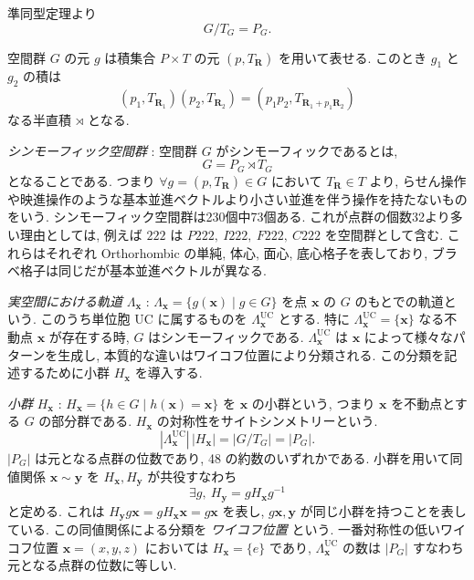 \documentclass[12pt]{article}
\newcommand{\vect}[1]{\boldsymbol{#1}}
\begin{document}
準同型定理より
\begin{equation}
 G / T_G = P_G.
\end{equation}

空間群 $G$ の元 $g$ は積集合 $P \times T$ の元 $(p, T_{\vect{R}})$ を用いて表せる. このとき $g_1$ と $g_2$ の積は
\begin{equation}
 (p_1, T_{\vect{R}_1}) (p_2, T_{\vect{R}_2}) = (p_1 p_2,
 T_{\vect{R}_1 + p_1 \vect{R}_2})
\end{equation}
なる半直積 $\rtimes$ となる.

\emph{シンモーフィック空間群} : 空間群 $G$ がシンモーフィックであるとは,
\begin{equation}
 G = P_G \rtimes T_G
\end{equation}
となることである. つまり $\forall g = (p, T_{\vect{R}}) \in G$ において $T_{\vect{R}} \in T$ より, らせん操作や映進操作のような基本並進ベクトルより小さい並進を伴う操作を持たないものをいう.
シンモーフィック空間群は230個中73個ある. これが点群の個数32より多い理由としては, 例えば $222$ は $P222,\ I222,\ F222,\ C222$ を空間群として含む. これらはそれぞれ Orthorhombic の単純, 体心, 面心, 底心格子を表しており, ブラベ格子は同じだが基本並進ベクトルが異なる.

\emph{実空間における軌道} $\Lambda_{\vect{x}}$ : $\Lambda_{\vect{x}} = \{g(\vect{x}) \mid g \in G\}$ を点 $\vect{x}$ の $G$ のもとでの軌道という. このうち単位胞 UC に属するものを $\Lambda_{\vect{x}}^{\mathrm{UC}}$ とする. 特に $\Lambda_{\vect{x}}^{\mathrm{UC}} = \{\vect{x}\}$ なる不動点 $\vect{x}$ が存在する時, $G$ はシンモーフィックである. $\Lambda_{\vect{x}}^{\mathrm{UC}}$ は $\vect{x}$ によって様々なパターンを生成し, 本質的な違いはワイコフ位置により分類される. この分類を記述するために小群 $H_{\vect{x}}$ を導入する.

\emph{小群} $H_{\vect{x}}$ : $H_{\vect{x}} = \{h \in G \mid h(\vect{x}) = \vect{x}\}$ を $\vect{x}$ の小群という, つまり $\vect{x}$ を不動点とする $G$ の部分群である. $H_{\vect{x}}$ の対称性をサイトシンメトリーという.
\begin{equation}
 |\Lambda_{\vect{x}}^{\mathrm{UC}}|\,|H_{\vect{x}}| = |G / T_G| = |P_G|.
\end{equation}
$|P_G|$ は元となる点群の位数であり, 48 の約数のいずれかである. 小群を用いて同値関係 $\vect{x} \sim \vect{y}$ を $H_{\vect{x}}, H_{\vect{y}}$ が共役すなわち
\begin{equation}
 \exists g, \ H_{\vect{y}} = g H_{\vect{x}} g^{-1}
\end{equation}
と定める. これは $H_{\vect{y}} g \vect{x} = g H_{\vect{x}} \vect{x} = g \vect{x}$ を表し, $g \vect{x}, \vect{y}$ が同じ小群を持つことを表している. この同値関係による分類を \emph{ワイコフ位置} という. 一番対称性の低いワイコフ位置 $\vect{x} = (x,y,z)$ においては $H_{\vect{x}} = \{e\}$ であり, $\Lambda_{\vect{x}}^{\mathrm{UC}}$ の数は $|P_G|$ すなわち元となる点群の位数に等しい.
\end{document}
